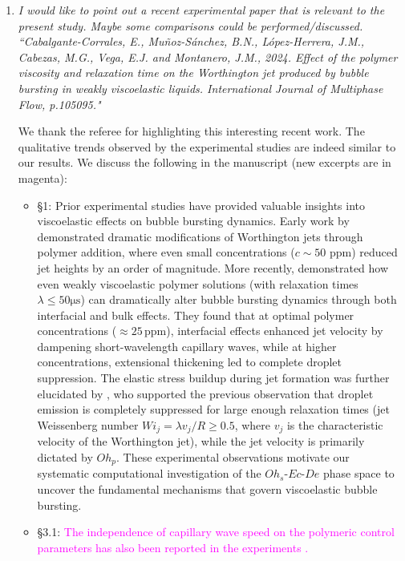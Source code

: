 \documentclass[]{article}
\newcommand{\rev}[1]{{\textcolor{magenta}{#1}}}
\begin{document}
\begin{enumerate}
\begin{itemize}
	\end{itemize}
	
	\item \textit{I would like to point out a recent experimental paper that is relevant to the present study. Maybe some comparisons could be performed/discussed. ``Cabalgante-Corrales, E., Muñoz-Sánchez, B.N., López-Herrera, J.M., Cabezas, M.G., Vega, E.J. and Montanero, J.M., 2024. Effect of the polymer viscosity and relaxation time on the Worthington jet produced by bubble bursting in weakly viscoelastic liquids. International Journal of Multiphase Flow, p.105095."}
	
	We thank the referee for highlighting this interesting recent work. The qualitative trends observed by the experimental studies are indeed similar to our results. We discuss the following in the manuscript (new excerpts are in magenta):
	
 \begin{itemize}
		\item 
		\S 1: Prior experimental studies have provided valuable insights into viscoelastic effects on bubble bursting dynamics. Early work by \citet{cheny1996extravagant} demonstrated dramatic modifications of Worthington jets through polymer addition, where even small concentrations ($c \sim 50$ ppm) reduced jet heights by an order of magnitude. More recently, \citet{rodriguez2023bubble} demonstrated how even weakly viscoelastic polymer solutions (with relaxation times $\lambda \leq 50\si{\micro\second}$) can dramatically alter bubble bursting dynamics through both interfacial and bulk effects. They found that at optimal polymer concentrations ($\approx 25\,\text{ppm}$), interfacial effects enhanced jet velocity by dampening short-wavelength capillary waves, while at higher concentrations, extensional thickening led to complete droplet suppression.
		The elastic stress buildup during jet formation was further elucidated by \citet{cabalganteeffect}, who supported the previous observation that droplet emission is completely suppressed for large enough relaxation times (jet Weissenberg number $Wi_j = \lambda v_j/R \ge 0.5$, where $v_j$ is the characteristic velocity of the Worthington jet), while the jet velocity is primarily dictated by $Oh_p$. These experimental observations motivate our systematic computational investigation of the $Oh_s$-$Ec$-$De$ phase space to uncover the fundamental mechanisms that govern viscoelastic bubble bursting. 
	
	\item 
	\S3.1: \rev{The independence of capillary wave speed on the polymeric control parameters has also been reported in the experiments \citep{cabalganteeffect}. }
	

\end{itemize}
\end{enumerate}
\end{document}
